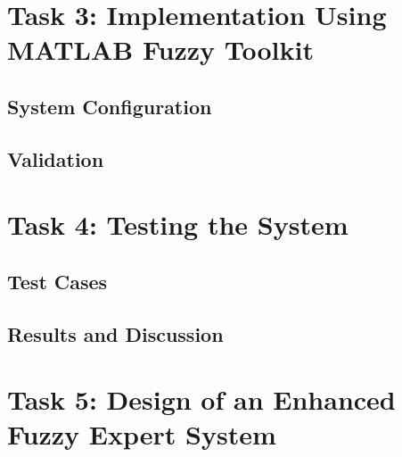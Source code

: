 \documentclass{article}
\begin{document}
\section{Task 3: Implementation Using MATLAB Fuzzy Toolkit}


\subsection{System Configuration}


\subsection{Validation}


\section{Task 4: Testing the System}


\subsection{Test Cases}


\subsection{Results and Discussion}


\section{Task 5: Design of an Enhanced Fuzzy Expert System}
\end{document}
